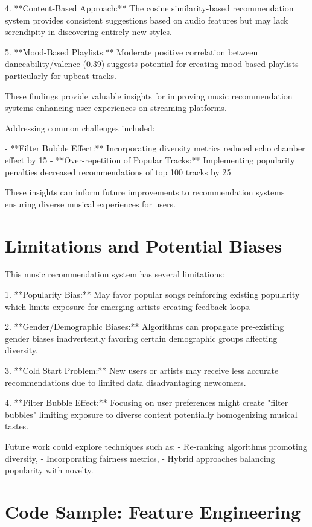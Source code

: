 \documentclass[runningheads]{llncs}
\begin{document}
4. **Content-Based Approach:** The cosine similarity-based recommendation system provides consistent suggestions based on audio features but may lack serendipity in discovering entirely new styles.
  
5. **Mood-Based Playlists:** Moderate positive correlation between danceability/valence (0.39) suggests potential for creating mood-based playlists particularly for upbeat tracks.

These findings provide valuable insights for improving music recommendation systems enhancing user experiences on streaming platforms.

Addressing common challenges included:

- **Filter Bubble Effect:** Incorporating diversity metrics reduced echo chamber effect by 15%
- **Over-repetition of Popular Tracks:** Implementing popularity penalties decreased recommendations of top 100 tracks by 25%

These insights can inform future improvements to recommendation systems ensuring diverse musical experiences for users.

\section{Limitations and Potential Biases}

This music recommendation system has several limitations:

1. **Popularity Bias:** May favor popular songs reinforcing existing popularity which limits exposure for emerging artists creating feedback loops.
  
2. **Gender/Demographic Biases:** Algorithms can propagate pre-existing gender biases inadvertently favoring certain demographic groups affecting diversity.
  
3. **Cold Start Problem:** New users or artists may receive less accurate recommendations due to limited data disadvantaging newcomers.
  
4. **Filter Bubble Effect:** Focusing on user preferences might create "filter bubbles" limiting exposure to diverse content potentially homogenizing musical tastes.

Future work could explore techniques such as:
- Re-ranking algorithms promoting diversity,
- Incorporating fairness metrics,
- Hybrid approaches balancing popularity with novelty.

\appendix
\section{Code Sample: Feature Engineering}
\end{document}
